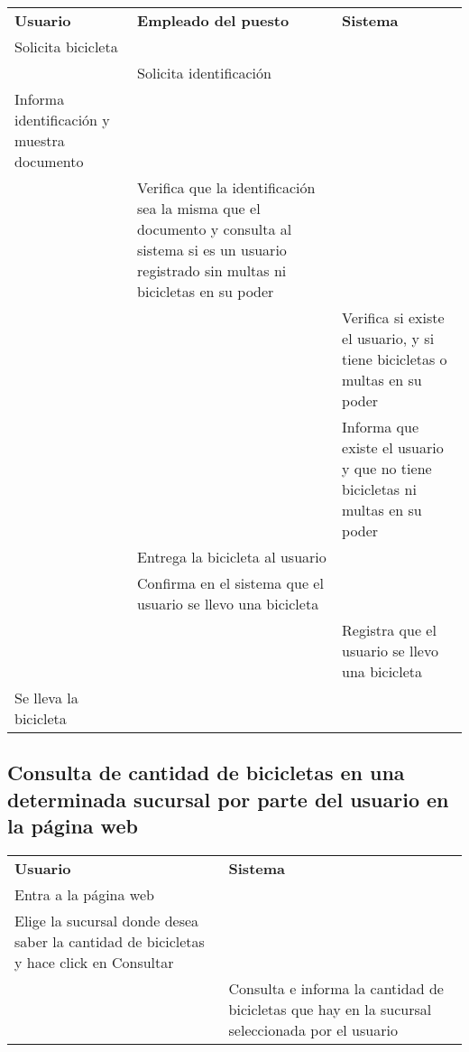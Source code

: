 \documentclass[a4paper, 11pt, spanish]{article}
\begin{document}
\begin{tabular}{|p{5cm}|p{5cm}|p{5cm}|}
\cline{1-3}
\textbf{Usuario} & \textbf{Empleado del puesto} & \textbf{Sistema} \\ \cline{1-3}
Solicita bicicleta & &\\ \cline{1-3}
 & Solicita identificación &    \\ \cline{1-3}
Informa identificación y muestra documento & & \\ \cline{1-3}
 & Verifica que la identificación sea la misma que el documento y consulta al sistema si es un usuario registrado sin multas ni bicicletas en su poder & \\ \cline{1-3}
 & & Verifica si existe el usuario, y si tiene bicicletas o multas en su poder \\ \cline{1-3}
 & & Informa que existe el usuario y que no tiene bicicletas ni multas en su poder \\ \cline{1-3}
 & Entrega la bicicleta al usuario &    \\ \cline{1-3}
 & Confirma en el sistema que el usuario se llevo una bicicleta &    \\ \cline{1-3}
 &  & Registra que el usuario se llevo una bicicleta \\ \cline{1-3}
Se lleva la bicicleta & &    \\ \cline{1-3}
\end{tabular}

\endgroup

\subsection{Consulta de cantidad de bicicletas en una determinada sucursal por parte del usuario en la página web}

\begingroup
    \fontsize{8pt}{12pt}\selectfont

\begin{tabular}{|p{7cm}|p{7cm}|}
\cline{1-2}
\textbf{Usuario} & \textbf{Sistema} \\ \cline{1-2}
Entra a la página web & \\ \cline{1-2}
Elige la sucursal donde desea saber la cantidad de bicicletas y hace click en Consultar& \\ \cline{1-2}
 &Consulta e informa la cantidad de bicicletas que hay en la sucursal seleccionada por el usuario \\ \cline{1-2}
\end{tabular}

\endgroup
\end{document}
